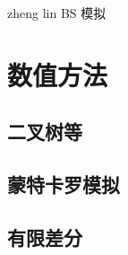 \documentclass[11pt]{article}
\begin{document}
zheng lin
BS 
模拟


\section{数值方法}


\subsection{二叉树等}


\subsection{蒙特卡罗模拟}


\subsection{有限差分}



\appendix
\end{document}

